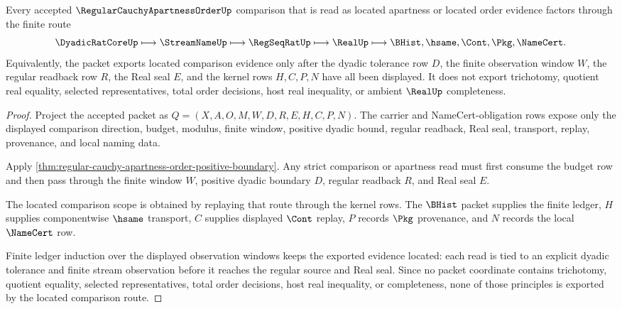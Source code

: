 \begin{theorem}
\label{thm:regular-cauchy-apartness-order-located-comparison-scope}
Every accepted $\RegularCauchyApartnessOrderUp$ comparison that is read as located apartness or located order evidence factors through the finite route
$$
\DyadicRatCoreUp \longmapsto \StreamNameUp \longmapsto \RegSeqRatUp \longmapsto \RealUp \longmapsto \BHist,\hsame,\Cont,\Pkg,\NameCert .
$$
Equivalently, the packet exports located comparison evidence only after the dyadic tolerance row $D$, the finite observation window $W$, the regular readback row $R$, the Real seal $E$, and the kernel rows $H,C,P,N$ have all been displayed. It does not export trichotomy, quotient real equality, selected representatives, total order decisions, host real inequality, or ambient $\RealUp$ completeness.
\end{theorem}
\begin{proof}
Project the accepted packet as $Q=(X,A,O,M,W,D,R,E,H,C,P,N)$. The carrier and NameCert-obligation rows expose only the displayed comparison direction, budget, modulus, finite window, positive dyadic bound, regular readback, Real seal, transport, replay, provenance, and local naming data.

Apply \autoref{thm:regular-cauchy-apartness-order-positive-boundary}. Any strict comparison or apartness read must first consume the budget row and then pass through the finite window $W$, positive dyadic boundary $D$, regular readback $R$, and Real seal $E$.

The located comparison scope is obtained by replaying that route through the kernel rows. The $\BHist$ packet supplies the finite ledger, $H$ supplies componentwise $\hsame$ transport, $C$ supplies displayed $\Cont$ replay, $P$ records $\Pkg$ provenance, and $N$ records the local $\NameCert$ row.

Finite ledger induction over the displayed observation windows keeps the exported evidence located: each read is tied to an explicit dyadic tolerance and finite stream observation before it reaches the regular source and Real seal. Since no packet coordinate contains trichotomy, quotient equality, selected representatives, total order decisions, host real inequality, or completeness, none of those principles is exported by the located comparison route.
\end{proof}

